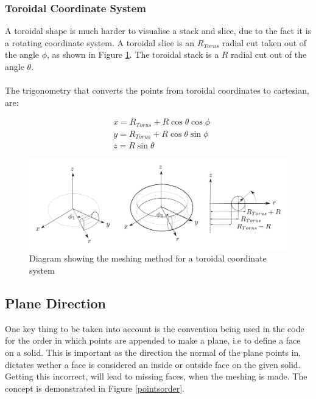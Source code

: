 \documentclass[12pt,a4paper]{article}
\begin{document}
%

\newpage
\subsubsection{Toroidal Coordinate System}

A toroidal shape is much harder to visualise a stack and slice, due to the fact it is a rotating coordinate system. A toroidal slice is an $R_{Torus}$ radial cut taken out of the angle $\phi$, as shown in Figure \ref{tormeshin}. The toroidal stack is a $R$ radial cut out of the angle $\theta$. 
\\\\
The trigonometry that converts the points from toroidal coordinates to cartesian, are:

\begin{equation}
\begin{aligned}
& x = R_{Torus} + R\cos{\theta}\cos{\phi} \\
& y = R_{Torus} + R\cos{\theta}\sin{\phi} \\
& z =  R\sin{\theta} 
\end{aligned}
\end{equation}

\begin{figure}[h!]
\centering
\includegraphics[scale=0.35]{Images//Coords/torus_coords.png}
\caption[width=\columnwidth]{Diagram showing the meshing method for a toroidal coordinate system}
\label{tormeshin}
\end{figure}

\subsection{Plane Direction}
One key thing to be taken into account is the convention being used in the code for the order in which points are appended to make a plane, i.e to define a face on a solid. This is important as the direction the normal of the plane points in, dictates wether a face is considered an inside or outside face on the given solid. Getting this incorrect, will lead to missing faces, when the meshing is made. The concept is demonstrated in Figure \ref{pointsorder}.
\end{document}

